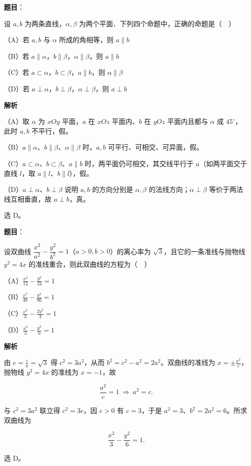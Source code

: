 \begin{answer}

\textbf{题目}：

设 $a,b$ 为两条直线，$\alpha,\beta$ 为两个平面．下列四个命题中，正确的命题是（　）

（A）若 $a,b$ 与 $\alpha$ 所成的角相等，则 $a\parallel b$

（B）若 $a\parallel\alpha$，$b\parallel\beta$，$\alpha\parallel\beta$，则 $a\parallel b$

（C）若 $a\subset\alpha$，$b\subset\beta$，$a\parallel b$，则 $\alpha\parallel\beta$

（D）若 $a\perp\alpha$，$b\perp\beta$，$\alpha\perp\beta$，则 $a\perp b$

\textbf{解析}

（A）取 $\alpha$ 为 $xOy$ 平面，$a$ 在 $xOz$ 平面内、$b$ 在 $yOz$ 平面内且都与 $\alpha$ 成 $45^\circ$，此时 $a,b$ 不平行，假。

（B）$a\parallel\alpha$、$b\parallel\beta$、$\alpha\parallel\beta$ 时，$a,b$ 可平行、可相交、可异面，假。

（C）$a\subset\alpha$、$b\subset\beta$、$a\parallel b$ 时，两平面仍可相交，其交线平行于 $a$（如两平面交于直线 $l$，取 $a\parallel l$、$b\parallel l$），假。

（D）$a\perp\alpha$、$b\perp\beta$ 说明 $a,b$ 的方向分别是 $\alpha,\beta$ 的法线方向；$\alpha\perp\beta$ 等价于两法线互相垂直，故 $a\perp b$，真。

选 D。


\end{answer}
\begin{answer}

\textbf{题目}：

设双曲线 $\dfrac{x^2}{a^2}-\dfrac{y^2}{b^2}=1$（$a>0,b>0$）的离心率为 $\sqrt3$，且它的一条准线与抛物线 $y^2=4x$ 的准线重合，则此双曲线的方程为（　）

（A）$\frac{x^2}{12}-\frac{y^2}{24}=1$

（B）$\frac{x^2}{48}-\frac{y^2}{96}=1$

（C）$\frac{x^2}{3}-\frac{2y^2}{3}=1$

（D）$\frac{x^2}{3}-\frac{y^2}{6}=1$

\textbf{解析}

由 $e=\frac ca=\sqrt3$ 得 $c^2=3a^2$，从而 $b^2=c^2-a^2=2a^2$。双曲线的准线为 $x=\pm\frac{a^2}c$，抛物线 $y^2=4x$ 的准线为 $x=-1$，故

\nopagebreak[4]
\[\frac{a^2}{c}=1\ \Longrightarrow\ a^2=c .\]

与 $c^2=3a^2$ 联立得 $c^2=3c$，因 $c>0$ 有 $c=3$，于是 $a^2=3$、$b^2=2a^2=6$。所求双曲线为

\nopagebreak[4]
\[\frac{x^2}{3}-\frac{y^2}{6}=1 .\]

选 D。


\end{answer}
